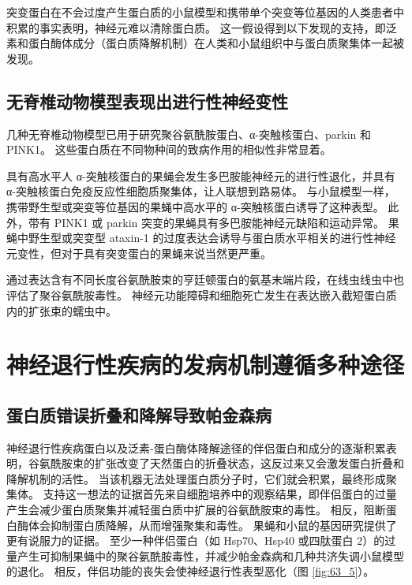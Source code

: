 突变蛋白在不会过度产生蛋白质的小鼠模型和携带单个突变等位基因的人类患者中积累的事实表明，神经元难以清除蛋白质。
这一假设得到以下发现的支持，即泛素和蛋白酶体成分（蛋白质降解机制）在人类和小鼠组织中与蛋白质聚集体一起被发现。



\subsection{无脊椎动物模型表现出进行性神经变性}

几种无脊椎动物模型已用于研究聚谷氨酰胺蛋白、α-突触核蛋白、parkin 和 PINK1。
这些蛋白质在不同物种间的致病作用的相似性非常显着。


具有高水平人 α-突触核蛋白的果蝇会发生多巴胺能神经元的进行性退化，并具有 α-突触核蛋白免疫反应性细胞质聚集体，让人联想到路易体。
与小鼠模型一样，携带野生型或突变等位基因的果蝇中高水平的 α-突触核蛋白诱导了这种表型。
此外，带有 PINK1 或 parkin 突变的果蝇具有多巴胺能神经元缺陷和运动异常。
果蝇中野生型或突变型 ataxin-1 的过度表达会诱导与蛋白质水平相关的进行性神经元变性，但对于具有突变蛋白的果蝇来说当然更严重。


通过表达含有不同长度谷氨酰胺束的亨廷顿蛋白的氨基末端片段，在线虫线虫中也评估了聚谷氨酰胺毒性。
神经元功能障碍和细胞死亡发生在表达嵌入截短蛋白质内的扩张束的蠕虫中。



\section{神经退行性疾病的发病机制遵循多种途径}

\subsection{蛋白质错误折叠和降解导致帕金森病}

神经退行性疾病蛋白以及泛素-蛋白酶体降解途径的伴侣蛋白和成分的逐渐积累表明，谷氨酰胺束的扩张改变了天然蛋白的折叠状态，这反过来又会激发蛋白折叠和降解机制的活性。
当该机器无法处理蛋白质分子时，它们就会积累，最终形成聚集体。
支持这一想法的证据首先来自细胞培养中的观察结果，即伴侣蛋白的过量产生会减少蛋白质聚集并减轻蛋白质中扩展的谷氨酰胺束的毒性。
相反，阻断蛋白酶体会抑制蛋白质降解，从而增强聚集和毒性。
果蝇和小鼠的基因研究提供了更有说服力的证据。
至少一种伴侣蛋白（如 Hsp70、Hsp40 或四肽蛋白 2）的过量产生可抑制果蝇中的聚谷氨酰胺毒性，并减少帕金森病和几种共济失调小鼠模型的退化。
相反，伴侣功能的丧失会使神经退行性表型恶化（图 \ref{fig:63_5}）。


